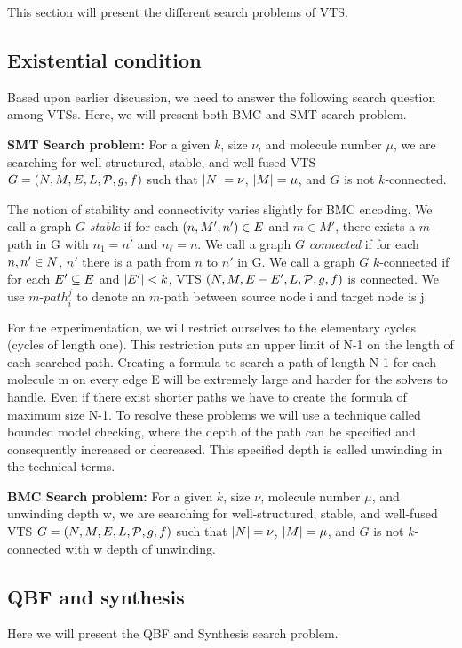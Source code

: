 This section will present the different search problems of VTS.

\subsection{Existential condition}

Based upon earlier discussion, we need to answer the following search
question among VTSs.
%
Here, we will present both BMC and SMT search problem.

\textbf{SMT Search problem:}
For a given $k$, size $\nu$, and molecule number $\mu$,
we are searching for well-structured, stable, and well-fused VTS
$G = (N,M,E,L,\mathcal{P},g,f)$ such that
$|N| = \nu$, $|M| = \mu$, and
$G$ is not $k$-connected.    

\noindent
The notion of stability and connectivity varies slightly for BMC encoding. 
%
We call a graph $G$ {\em stable} if for each $(n,M',n') \in E$ and $m \in M'$,
there exists a $m$-path in G with $n_1 = n'$ and $n_\ell = n$.
%
%
We call a graph $G$ {\em connected} if for each $n,n' \in N$,
$n'$ there is a path from $n$ to $n'$ in G.
%
We call a graph $G$ $k$-connected if for each $E' \subseteq E$ and $|E'| < k$,
VTS $(N,M,E-E',L,\mathcal{P},g,f)$ is connected.
%	
We use $m$-${path}_i^j$ to denote an $m$-path between source node i and target node is j. 

For the experimentation, we will restrict ourselves to the elementary cycles (cycles of length one). 
%
This restriction puts an upper limit of N-1 on the length of each searched path. 
%
Creating a formula to search a path of length N-1 for each molecule m on every edge E will be extremely large and harder for the solvers to handle.  
%
Even if there exist shorter paths we have to create the formula of maximum size N-1. 
% 
To resolve these problems we will use a technique called bounded model checking, where the depth of the path can be specified and consequently increased or decreased.  
%
This specified depth is called unwinding in the technical terms.

\textbf{BMC Search problem:}
For a given $k$, size $\nu$, molecule number $\mu$, and unwinding depth w,
we are searching for well-structured, stable, and well-fused VTS
$G = (N,M,E,L,\mathcal{P},g,f)$ such that
$|N| = \nu$, $|M| = \mu$, and $G$ is not $k$-connected with w depth of unwinding.    

\subsection{QBF and synthesis}
Here we will present the QBF and Synthesis search problem.



             
